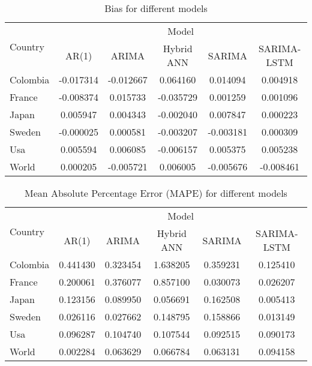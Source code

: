 \documentclass[hidelinks,11pts]{article}
\DeclareMathOperator{\1}{\mathbbm{1}}
\begin{document}
\begin{table}[htbp]
  \centering
  \caption{Bias for different models}
  \label{tab:bias}
  \begin{tabular}{lccccc}
    \toprule
    \multirow{2}{*}{Country} & \multicolumn{5}{c}{Model} \\
    \cmidrule(lr){2-6}
    & AR(1) & ARIMA & Hybrid ANN & SARIMA & SARIMA-LSTM \\
    \midrule
    Colombia & -0.017314 & -0.012667 & 0.064160 & 0.014094 & 0.004918 \\
    France & -0.008374 & 0.015733 & -0.035729 & 0.001259 & 0.001096 \\
    Japan & 0.005947 & 0.004343 & -0.002040 & 0.007847 & 0.000223 \\
    Sweden & -0.000025 & 0.000581 & -0.003207 & -0.003181 & 0.000309 \\
    Usa & 0.005594 & 0.006085 & -0.006157 & 0.005375 & 0.005238 \\
    World & 0.000205 & -0.005721 & 0.006005 & -0.005676 & -0.008461 \\
    \bottomrule
  \end{tabular}
\end{table}

\begin{table}[htbp]
  \centering
  \caption{Mean Absolute Percentage Error (MAPE) for different models}
  \label{tab:mape}
  \begin{tabular}{lccccc}
    \toprule
    \multirow{2}{*}{Country} & \multicolumn{5}{c}{Model} \\
    \cmidrule(lr){2-6}
    & AR(1) & ARIMA & Hybrid ANN & SARIMA & SARIMA-LSTM \\
    \midrule
    Colombia & 0.441430 & 0.323454 & 1.638205 & 0.359231 & 0.125410 \\
    France & 0.200061 & 0.376077 & 0.857100 & 0.030073 & 0.026207 \\
    Japan & 0.123156 & 0.089950 & 0.056691 & 0.162508 & 0.005413 \\
    Sweden & 0.026116 & 0.027662 & 0.148795 & 0.158866 & 0.013149 \\
    Usa & 0.096287 & 0.104740 & 0.107544 & 0.092515 & 0.090173 \\
    World & 0.002284 & 0.063629 & 0.066784 & 0.063131 & 0.094158 \\
    \bottomrule
  \end{tabular}
\end{table}
\end{document}
